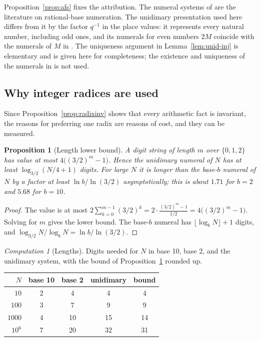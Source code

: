 \documentclass[11pt]{article}
\theoremstyle{definition}
\theoremstyle{plain}
\newtheorem{proposition}[definition]{Proposition}
\theoremstyle{remark}
\newtheorem{computation}[definition]{Computation}
\begin{document}
Proposition~\ref{prop:afs} fixes the attribution. The numeral systems of \cite{AFS08} are the literature on rational-base numeration. The unidimary presentation used here differs from it by the factor $q^{-1}$ in the place values: it represents every natural number, including odd ones, and its numerals for even numbers $2M$ coincide with the numerals of $M$ in \cite{AFS08}. The uniqueness argument in Lemma~\ref{lem:unid-inj} is elementary and is given here for completeness; the existence and uniqueness of the numerals in \cite{AFS08} is not used.

\subsection{Why integer radices are used}

Since Proposition~\ref{prop:radixinv} shows that every arithmetic fact is invariant, the reasons for preferring one radix are reasons of cost, and they can be measured.

\begin{proposition}[Length lower bound]\label{prop:len}
A digit string of length $m$ over $\{0,1,2\}$ has value at most $4\big((3/2)^m-1\big)$. Hence the unidimary numeral of $N$ has at least $\log_{3/2}(N/4+1)$ digits. For large $N$ it is longer than the base-$b$ numeral of $N$ by a factor at least $\ln b/\ln(3/2)$ asymptotically; this is about $1.71$ for $b=2$ and $5.68$ for $b=10$.
\end{proposition}
\begin{proof}
The value is at most $2\sum_{k=0}^{m-1}(3/2)^k=2\cdot\frac{(3/2)^m-1}{1/2}=4\big((3/2)^m-1\big)$. Solving for $m$ gives the lower bound. The base-$b$ numeral has $\lfloor\log_bN\rfloor+1$ digits, and $\log_{3/2}N/\log_bN=\ln b/\ln(3/2)$.
\end{proof}

\begin{computation}[Lengths]\label{comp:len}
Digits needed for $N$ in base 10, base 2, and the unidimary system, with the bound of Proposition~\ref{prop:len} rounded up.
\begin{center}
\small
\begin{tabular}{@{}rcccc@{}}
\toprule
$N$ & base 10 & base 2 & unidimary & bound \\
\midrule
$10$ & 2 & 4 & 4 & 4\\
$100$ & 3 & 7 & 9 & 9\\
$1000$ & 4 & 10 & 15 & 14\\
$10^6$ & 7 & 20 & 32 & 31\\
\bottomrule
\end{tabular}
\end{center}
\end{computation}
\end{document}
